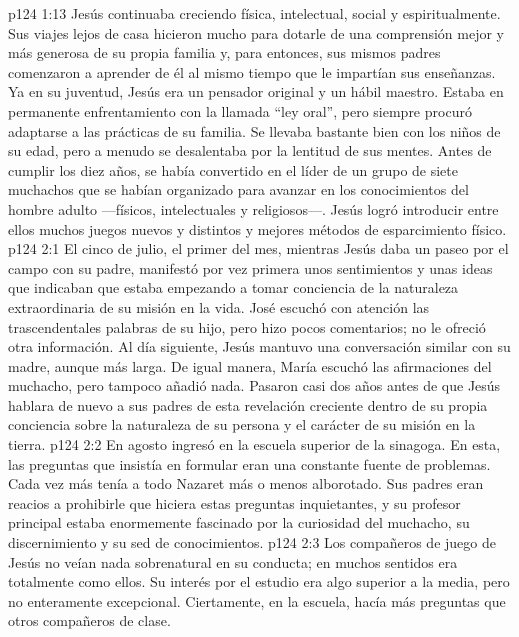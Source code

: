 \vs p124 1:13 Jesús continuaba creciendo física, intelectual, social y espiritualmente. Sus viajes lejos de casa hicieron mucho para dotarle de una comprensión mejor y más generosa de su propia familia y, para entonces, sus mismos padres comenzaron a aprender de él al mismo tiempo que le impartían sus enseñanzas. Ya en su juventud, Jesús era un pensador original y un hábil maestro. Estaba en permanente enfrentamiento con la llamada “ley oral”, pero siempre procuró adaptarse a las prácticas de su familia. Se llevaba bastante bien con los niños de su edad, pero a menudo se desalentaba por la lentitud de sus mentes. Antes de cumplir los diez años, se había convertido en el líder de un grupo de siete muchachos que se habían organizado para avanzar en los conocimientos del hombre adulto ---físicos, intelectuales y religiosos---. Jesús logró introducir entre ellos muchos juegos nuevos y distintos y mejores métodos de esparcimiento físico.
\vs p124 2:1 El cinco de julio, el primer  del mes, mientras Jesús daba un paseo por el campo con su padre, manifestó por vez primera unos sentimientos y unas ideas que indicaban que estaba empezando a tomar conciencia de la naturaleza extraordinaria de su misión en la vida. José escuchó con atención las trascendentales palabras de su hijo, pero hizo pocos comentarios; no le ofreció otra información. Al día siguiente, Jesús mantuvo una conversación similar con su madre, aunque más larga. De igual manera, María escuchó las afirmaciones del muchacho, pero tampoco añadió nada. Pasaron casi dos años antes de que Jesús hablara de nuevo a sus padres de esta revelación creciente dentro de su propia conciencia sobre la naturaleza de su persona y el carácter de su misión en la tierra.
\vs p124 2:2 \pc En agosto ingresó en la escuela superior de la sinagoga. En esta, las preguntas que insistía en formular eran una constante fuente de problemas. Cada vez más tenía a todo Nazaret más o menos alborotado. Sus padres eran reacios a prohibirle que hiciera estas preguntas inquietantes, y su profesor principal estaba enormemente fascinado por la curiosidad del muchacho, su discernimiento y su sed de conocimientos.
\vs p124 2:3 Los compañeros de juego de Jesús no veían nada sobrenatural en su conducta; en muchos sentidos era totalmente como ellos. Su interés por el estudio era algo superior a la media, pero no enteramente excepcional. Ciertamente, en la escuela, hacía más preguntas que otros compañeros de clase.
